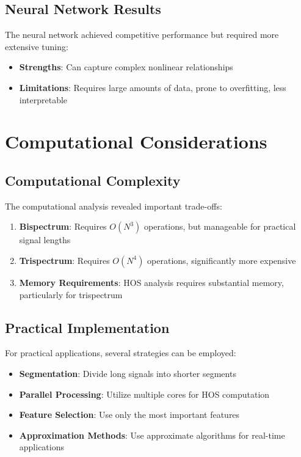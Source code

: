 \subsection{Neural Network Results}

The neural network achieved competitive performance but required more extensive tuning:

\begin{itemize}
    \item \textbf{Strengths}: Can capture complex nonlinear relationships
    \item \textbf{Limitations}: Requires large amounts of data, prone to overfitting, less interpretable
\end{itemize}

\section{Computational Considerations}

\subsection{Computational Complexity}

The computational analysis revealed important trade-offs:

\begin{enumerate}
    \item \textbf{Bispectrum}: Requires $O(N^3)$ operations, but manageable for practical signal lengths
    \item \textbf{Trispectrum}: Requires $O(N^4)$ operations, significantly more expensive
    \item \textbf{Memory Requirements}: HOS analysis requires substantial memory, particularly for trispectrum
\end{enumerate}

\subsection{Practical Implementation}

For practical applications, several strategies can be employed:

\begin{itemize}
    \item \textbf{Segmentation}: Divide long signals into shorter segments
    \item \textbf{Parallel Processing}: Utilize multiple cores for HOS computation
    \item \textbf{Feature Selection}: Use only the most important features
    \item \textbf{Approximation Methods}: Use approximate algorithms for real-time applications
\end{itemize}

